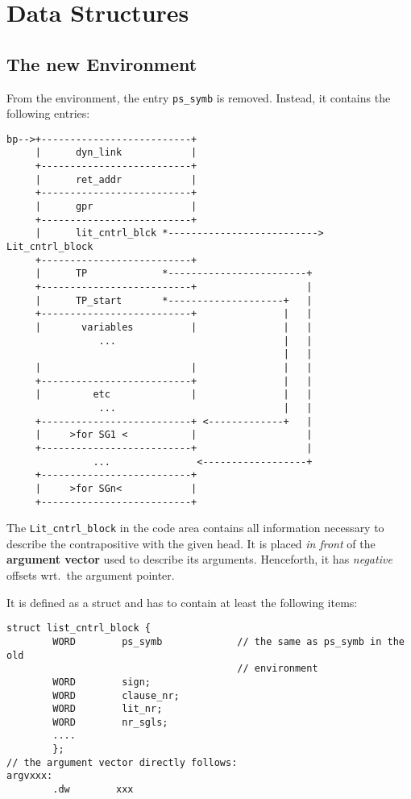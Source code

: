 \newpage
\section{Data Structures}

\subsection{The new Environment}

From the environment, the entry {\tt ps\_symb} is removed. Instead, it contains
the following entries:

\begin{verbatim}
bp-->+--------------------------+
     |      dyn_link            |
     +--------------------------+
     |      ret_addr            |
     +--------------------------+
     |      gpr                 |
     +--------------------------+
     |      lit_cntrl_blck *--------------------------> Lit_cntrl_block
     +--------------------------+
     |      TP             *------------------------+
     +--------------------------+                   |
     |      TP_start       *--------------------+   |
     +--------------------------+               |   |
     |       variables          |               |   |
                ...                             |   |
                                                |   |
     |                          |               |   |
     +--------------------------+               |   |
     |         etc              |               |   |
                ...                             |   |
     +--------------------------+ <-------------+   |
     |     >for SG1 <           |                   |
     +--------------------------+                   |
               ...               <------------------+
     +--------------------------+
     |     >for SGn<            |
     +--------------------------+

\end{verbatim}

The {\tt Lit\_cntrl\_block} in the code area contains all information
necessary to describe the contrapositive with the given head.
It is placed {\em in front} of the {\bf argument vector} used to describe
its arguments. Henceforth, it has {\em negative\/} offsets wrt.\ the
argument pointer.

It is defined as a struct and has to contain at least the following
items:

\begin{verbatim}
struct list_cntrl_block {
        WORD        ps_symb             // the same as ps_symb in the old
                                        // environment
        WORD        sign;
        WORD        clause_nr;
        WORD        lit_nr;        
        WORD        nr_sgls;
        ....
        };
// the argument vector directly follows:
argvxxx:
        .dw        xxx
\end{verbatim}


